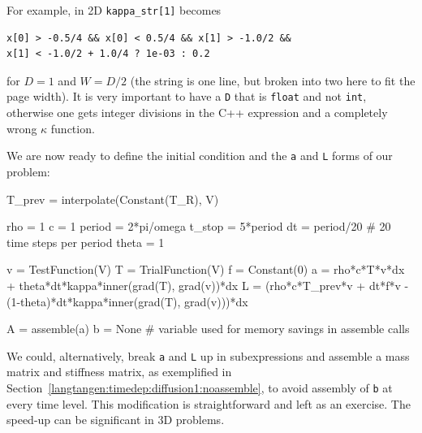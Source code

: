 For example, in 2D {\fontsize{10pt}{10pt}\verb!kappa_str[1]!} becomes
\begin{Verbatim}[fontsize=\fontsize{10pt}{10pt},tabsize=8,baselinestretch=0.85,
fontfamily=tt,xleftmargin=7mm]
x[0] > -0.5/4 && x[0] < 0.5/4 && x[1] > -1.0/2 && 
x[1] < -1.0/2 + 1.0/4 ? 1e-03 : 0.2
\end{Verbatim}
\noindent
for $D=1$ and $W=D/2$ (the string is one line, but
broken into two here to fit the page width). It is very important to have
a {\fontsize{10pt}{10pt}\texttt{D}} that is {\fontsize{10pt}{10pt}\texttt{float}} and not {\fontsize{10pt}{10pt}\texttt{int}}, otherwise one gets
integer divisions in the C++ expression and a completely wrong $\kappa$
function.

We are now ready to define the initial condition and the
{\fontsize{10pt}{10pt}\texttt{a}} and {\fontsize{10pt}{10pt}\texttt{L}} forms of our problem:
\begin{python}
T_prev = interpolate(Constant(T_R), V)

rho = 1
c = 1
period = 2*pi/omega
t_stop = 5*period
dt = period/20  # 20 time steps per period
theta = 1

v = TestFunction(V)
T = TrialFunction(V)
f = Constant(0)
a = rho*c*T*v*dx + theta*dt*kappa*inner(grad(T), grad(v))*dx
L = (rho*c*T_prev*v + dt*f*v -
     (1-theta)*dt*kappa*inner(grad(T), grad(v)))*dx

A = assemble(a)
b = None  # variable used for memory savings in assemble calls
\end{python}
We could, alternatively, break {\fontsize{10pt}{10pt}\texttt{a}} and {\fontsize{10pt}{10pt}\texttt{L}} up in subexpressions
and assemble a mass matrix and stiffness matrix, as exemplified in
Section~\ref{langtangen:timedep:diffusion1:noassemble}, to avoid
assembly of {\fontsize{10pt}{10pt}\texttt{b}} at every time level. This modification is
straightforward and left as an exercise. The speed-up can be significant
in 3D problems.

